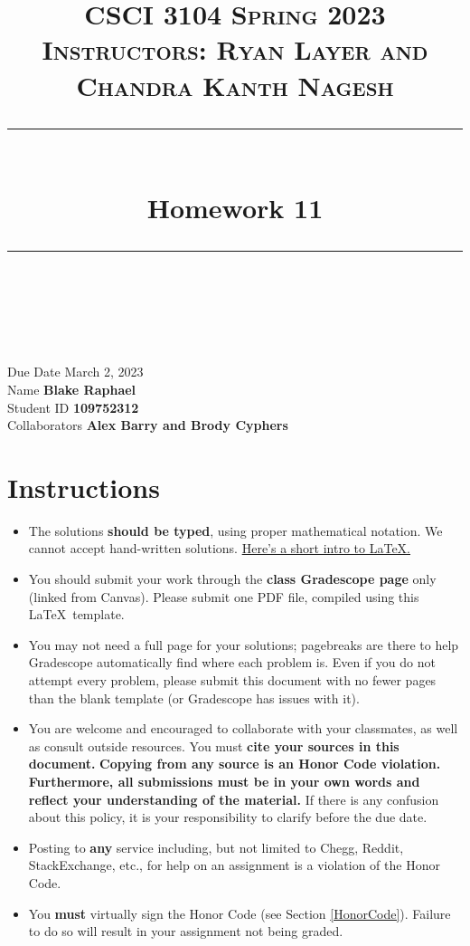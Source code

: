 \documentclass[11pt]{article}
\title{
\normalfont \normalsize 
\textsc{CSCI 3104 Spring 2023 \\ 
Instructors: Ryan Layer and Chandra Kanth Nagesh} \\
[10pt] 
\rule{\linewidth}{0.5pt} \\[6pt] 
\huge Homework 11 \\
\rule{\linewidth}{2pt}  \\[10pt]
}
\author{}
\date{}
\theoremstyle{definition}
\theoremstyle{definition}
\theoremstyle{definition}
\begin{document}

\maketitle


\noindent
Due Date \dotfill March 2, 2023 \\
Name \dotfill \textbf{Blake Raphael} \\
Student ID \dotfill \textbf{109752312} \\
Collaborators \dotfill \textbf{Alex Barry and Brody Cyphers}

\tableofcontents

\section{Instructions}
 \begin{itemize}
	\item The solutions \textbf{should be typed}, using proper mathematical notation. We cannot accept hand-written solutions. \href{http://ece.uprm.edu/~caceros/latex/introduction.pdf}{Here's a short intro to \LaTeX.}
	\item You should submit your work through the \textbf{class Gradescope page} only (linked from Canvas). Please submit one PDF file, compiled using this \LaTeX \ template.
	\item You may not need a full page for your solutions; pagebreaks are there to help Gradescope automatically find where each problem is. Even if you do not attempt every problem, please submit this document with no fewer pages than the blank template (or Gradescope has issues with it).

	\item You are welcome and encouraged to collaborate with your classmates, as well as consult outside resources. You must \textbf{cite your sources in this document.} \textbf{Copying from any source is an Honor Code violation. Furthermore, all submissions must be in your own words and reflect your understanding of the material.} If there is any confusion about this policy, it is your responsibility to clarify before the due date. 

	\item Posting to \textbf{any} service including, but not limited to Chegg, Reddit, StackExchange, etc., for help on an assignment is a violation of the Honor Code.

	\item You \textbf{must} virtually sign the Honor Code (see Section \ref{HonorCode}). Failure to do so will result in your assignment not being graded.
\end{itemize}
\end{document}
